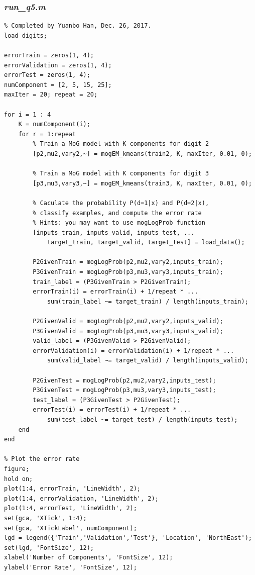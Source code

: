\documentclass{article}
\begin{document}
\subsubsection{\emph{run\_q5.m}}
\begin{lstlisting}
% Completed by Yuanbo Han, Dec. 26, 2017.
load digits;

errorTrain = zeros(1, 4);
errorValidation = zeros(1, 4);
errorTest = zeros(1, 4);
numComponent = [2, 5, 15, 25];
maxIter = 20; repeat = 20;

for i = 1 : 4
    K = numComponent(i);
    for r = 1:repeat
        % Train a MoG model with K components for digit 2
        [p2,mu2,vary2,~] = mogEM_kmeans(train2, K, maxIter, 0.01, 0);
        
        % Train a MoG model with K components for digit 3
        [p3,mu3,vary3,~] = mogEM_kmeans(train3, K, maxIter, 0.01, 0);
        
        % Caculate the probability P(d=1|x) and P(d=2|x),
        % classify examples, and compute the error rate
        % Hints: you may want to use mogLogProb function
        [inputs_train, inputs_valid, inputs_test, ...
            target_train, target_valid, target_test] = load_data();
        
        P2GivenTrain = mogLogProb(p2,mu2,vary2,inputs_train);
        P3GivenTrain = mogLogProb(p3,mu3,vary3,inputs_train);
        train_label = (P3GivenTrain > P2GivenTrain);
        errorTrain(i) = errorTrain(i) + 1/repeat * ...
            sum(train_label ~= target_train) / length(inputs_train);
        
        P2GivenValid = mogLogProb(p2,mu2,vary2,inputs_valid);
        P3GivenValid = mogLogProb(p3,mu3,vary3,inputs_valid);
        valid_label = (P3GivenValid > P2GivenValid);
        errorValidation(i) = errorValidation(i) + 1/repeat * ...
            sum(valid_label ~= target_valid) / length(inputs_valid);
        
        P2GivenTest = mogLogProb(p2,mu2,vary2,inputs_test);
        P3GivenTest = mogLogProb(p3,mu3,vary3,inputs_test);
        test_label = (P3GivenTest > P2GivenTest);
        errorTest(i) = errorTest(i) + 1/repeat * ...
            sum(test_label ~= target_test) / length(inputs_test);
    end
end

% Plot the error rate
figure;
hold on;
plot(1:4, errorTrain, 'LineWidth', 2);
plot(1:4, errorValidation, 'LineWidth', 2);
plot(1:4, errorTest, 'LineWidth', 2);
set(gca, 'XTick', 1:4);
set(gca, 'XTickLabel', numComponent);
lgd = legend({'Train','Validation','Test'}, 'Location', 'NorthEast');
set(lgd, 'FontSize', 12);
xlabel('Number of Components', 'FontSize', 12);
ylabel('Error Rate', 'FontSize', 12);

\end{lstlisting}
\end{document}
